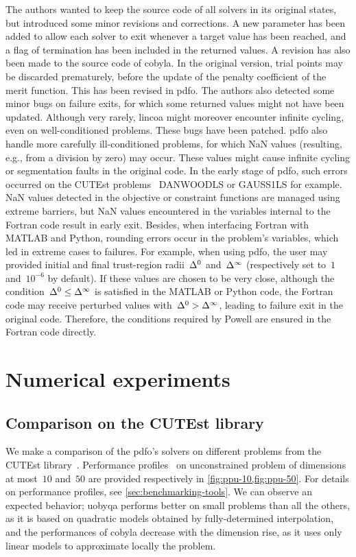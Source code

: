 The authors wanted to keep the source code of all solvers in its original states, but introduced some minor revisions and corrections.
A new parameter has been added to allow each solver to exit whenever a target value has been reached, and a flag of termination has been included in the returned values.
A revision has also been made to the source code of \gls{cobyla}.
In the original version, trial points may be discarded prematurely, before the update of the penalty coefficient of the merit function.
This has been revised in \gls{pdfo}.
The authors also detected some minor bugs on failure exits, for which some returned values might not have been updated.
Although very rarely, \gls{lincoa} might moreover encounter infinite cycling, even on well-conditioned problems.
These bugs have been patched.
\Gls{pdfo} also handle more carefully ill-conditioned problems, for which NaN values (resulting, e.g., from a division by zero) may occur.
These values might cause infinite cycling or segmentation faults in the original code.
In the early stage of \gls{pdfo}, such errors occurred on the CUTEst problems~\cite{Gould_Orban_Toint_2015} DANWOODLS or GAUSS1LS for example.
NaN values detected in the objective or constraint functions are managed using extreme barriers, but NaN values encountered in the variables internal to the Fortran code result in early exit.
Besides, when interfacing Fortran with MATLAB and Python, rounding errors occur in the problem's variables, which led in extreme cases to failures.
For example, when using \gls{pdfo}, the user may provided initial and final trust-region radii~$\rad[0]$ and~$\rad[\infty]$ (respectively set to~$1$ and~$10^{-6}$ by default).
If these values are chosen to be very close, although the condition~$\rad[0] \le \rad[\infty]$ is satisfied in the MATLAB or Python code, the Fortran code may receive perturbed values with~$\rad[0] > \rad[\infty]$, leading to failure exit in the original code.
Therefore, the conditions required by Powell are ensured in the Fortran code directly.

\section{Numerical experiments}
\label{sec:pdfo-experiments}

\subsection{Comparison on the CUTEst library}

We make a comparison of the \gls{pdfo}'s solvers on different problems from the CUTEst library~\cite{Gould_Orban_Toint_2015}.
Performance profiles~\cite{Dolan_More_2002,More_Wild_2009} on unconstrained problem of dimensions at most~$10$ and~$50$ are provided respectively in \cref{fig:ppu-10,fig:ppu-50}.
For details on performance profiles, see \cref{sec:benchmarking-tools}.
We can observe an expected behavior; \gls{uobyqa} performs better on small problems than all the others, as it is based on quadratic models obtained by fully-determined interpolation, and the performances of \gls{cobyla} decrease with the dimension rise, as it uses only linear models to approximate locally the problem.

